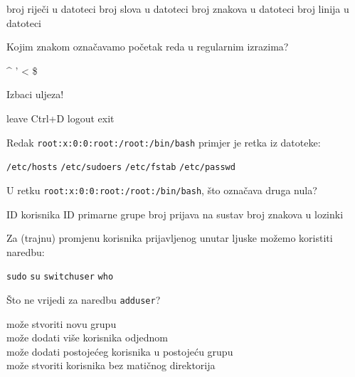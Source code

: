 \documentclass[a4paper,11pt]{exam}
\newcommand{\shell}[1]{\texttt{#1}}
\begin{document}
\begin{questions}
	\begin{oneparchoices}
		\choice broj riječi u datoteci
		\CorrectChoice broj slova u datoteci
		\choice broj znakova u datoteci
		\choice broj linija u datoteci
	\end{oneparchoices}
	
	\question
	Kojim znakom označavamo početak reda u regularnim izrazima? 
	
	\begin{oneparchoices}
		\CorrectChoice \textasciicircum
		\choice '
		\choice <
		\choice \$ 
	\end{oneparchoices}
	
	\question
	Izbaci uljeza!
	
	\begin{oneparchoices}
		\CorrectChoice leave
		\choice Ctrl+D
		\choice logout
		\choice exit
	\end{oneparchoices}

	\question
	Redak \shell{root:x:0:0:root:/root:/bin/bash} primjer je retka iz datoteke:
	
	\begin{oneparchoices}
		\choice \shell{/etc/hosts} 
		\choice \shell{/etc/sudoers} 
		\choice \shell{/etc/fstab} 
		\CorrectChoice \shell{/etc/passwd}
	\end{oneparchoices}
	
	\question
	U retku \shell{root:x:0:0:root:/root:/bin/bash}, što označava druga nula?
	
	\begin{oneparchoices}
		\choice ID korisnika
		\CorrectChoice ID primarne grupe
		\choice broj prijava na sustav
		\choice broj znakova u lozinki
	\end{oneparchoices}
	
	\question
	Za (trajnu) promjenu korisnika prijavljenog unutar ljuske možemo koristiti naredbu:
	
	\begin{oneparchoices}
		\choice \shell{sudo}
		\CorrectChoice \shell{su}
		\choice \shell{switchuser}
		\choice \shell{who}
	\end{oneparchoices}
	
	\question
	Što ne vrijedi za naredbu \shell{adduser}?
	
	\begin{oneparchoices}
		\choice može stvoriti novu grupu \\
		\CorrectChoice može dodati više korisnika odjednom \\
		\choice može dodati postojećeg korisnika u postojeću grupu \\
		\choice može stvoriti korisnika bez matičnog direktorija
	\end{oneparchoices}
	

\end{questions}
\end{document}
